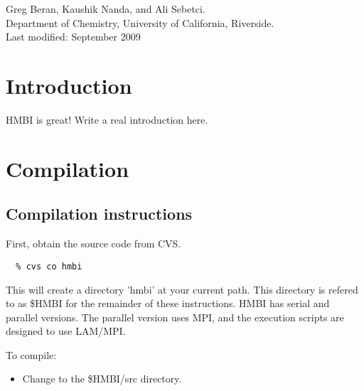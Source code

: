 \documentclass[11pt,letterpaper]{article}
\begin{document}
\begin{spacing}{1.0}

\thispagestyle{empty}


\section*{}

\thispagestyle{empty}

\noindent
\begin{center}
Greg Beran, Kaushik Nanda, and Ali Sebetci.  \\
Department of Chemistry, University of California, Riverside.\\
Last modified: September 2009
\end{center}

\tableofcontents
\vspace{5mm}

\section{Introduction}

HMBI is great!  Write a real introduction here.




\section{Compilation}

\subsection{Compilation instructions}

First, obtain the source code from CVS.  
\begin{verbatim}
  % cvs co hmbi
\end{verbatim}

This will create a directory 'hmbi' at your current path.  This directory
is refered to as \$HMBI for the remainder of these instructions.
HMBI has serial and parallel versions.  The parallel version uses
MPI, and the execution scripts are designed to use LAM/MPI.  

To compile:
\begin{itemize}
\item Change to the \$HMBI/src directory.


\end{itemize}
\end{spacing}
\end{document}

